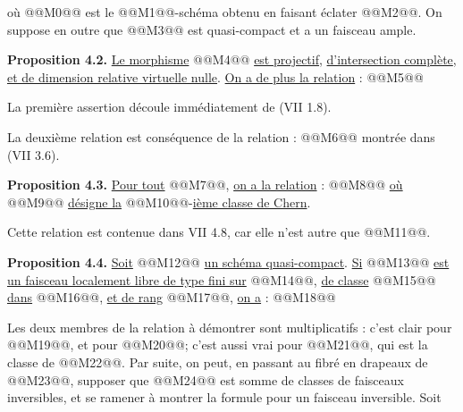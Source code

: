
où @@M0@@ est le @@M1@@-schéma
obtenu en faisant éclater @@M2@@. On suppose en outre que @@M3@@ est quasi-compact et a un faisceau ample.

\textbf{Proposition 4.2.} \uline{Le morphisme} @@M4@@ \uline{est projectif}, \uline{d'intersection complète}, \uline{et de dimension relative virtuelle nulle}. \uline{On a de plus la relation} :
@@M5@@

La première assertion découle immédiatement de (VII 1.8).

La deuxième relation est conséquence de la relation :
@@M6@@
montrée dans (VII 3.6).

\textbf{Proposition 4.3.} \uline{Pour tout} @@M7@@, \uline{on a la relation} :
@@M8@@
\uline{où} @@M9@@ \uline{désigne la} @@M10@@-\uline{ième classe de Chern}.

Cette relation est contenue dans VII 4.8, car elle n'est autre que @@M11@@.

\textbf{Proposition 4.4.} \uline{Soit} @@M12@@ \uline{un schéma quasi-compact}. \uline{Si} @@M13@@ \uline{est un faisceau localement libre de type fini sur} @@M14@@, \uline{de classe} @@M15@@ \uline{dans} @@M16@@, \uline{et de rang} @@M17@@, \uline{on a} :
@@M18@@

Les deux membres de la relation à démontrer sont multiplicatifs : c'est clair pour @@M19@@, et pour @@M20@@; c'est aussi vrai pour @@M21@@, qui est la classe de @@M22@@. Par suite, on peut, en passant au fibré en drapeaux de @@M23@@, supposer que @@M24@@ est somme de classes de faisceaux inversibles, et se ramener à montrer la formule pour un faisceau inversible. Soit
